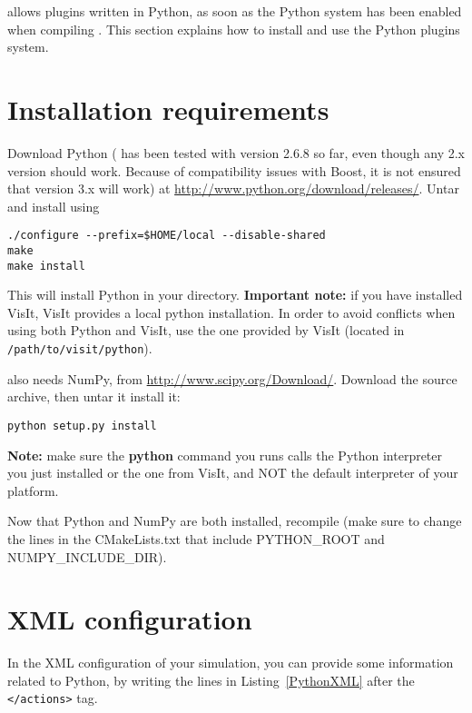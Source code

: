 \Damaris{} allows plugins written in Python, as soon as the Python system has been
enabled when compiling \Damaris{}. This section explains how to install and use the Python
plugins system.

\section{Installation requirements}

Download Python (\Damaris{} has been tested with version 2.6.8 so far, even though any 2.x version
should work. Because of compatibility issues with Boost, it is not ensured that version 3.x will work) at 
\url{http://www.python.org/download/releases/}.
Untar and install using
\begin{verbatim}
./configure --prefix=$HOME/local --disable-shared
make
make install
\end{verbatim}

This will install Python in your \installdir directory. \textbf{Important note:} if you have installed VisIt,
VisIt provides a local python installation. In order to avoid conflicts when using both Python and VisIt,
use the one provided by VisIt (located in \texttt{/path/to/visit/python}).

\Damaris{} also needs NumPy, from \url{http://www.scipy.org/Download/}. Download the source archive,
then untar it install it:

\begin{verbatim}
python setup.py install
\end{verbatim}
\textbf{Note:} make sure the \textbf{python} command you runs calls the Python interpreter you just installed
or the one from VisIt, and NOT the default interpreter of your platform.

Now that Python and NumPy are both installed, recompile \Damaris{} (make sure to change
the lines in the CMakeLists.txt that include PYTHON\_ROOT and NUMPY\_INCLUDE\_DIR).

\section{XML configuration}

In the XML configuration of your simulation, you can provide some information related to
Python, by writing the lines in Listing~\ref{PythonXML} after the \texttt{</actions>} tag.


